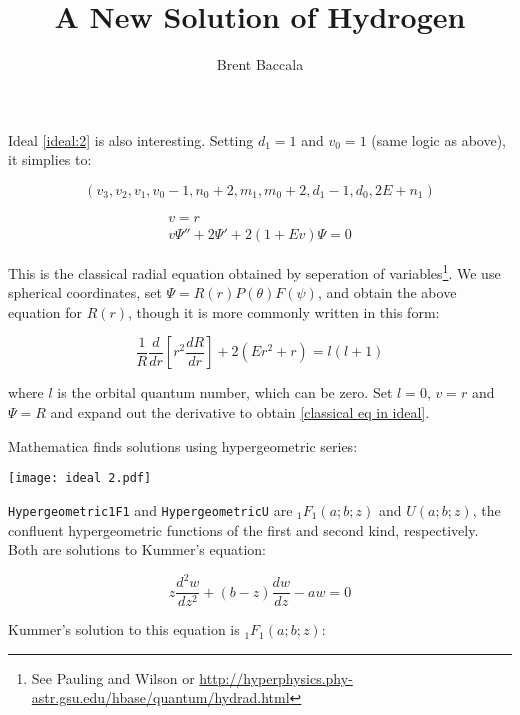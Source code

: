 \documentclass{article}
\title{A New Solution of Hydrogen}
\author{Brent Baccala}
\begin{document}
\parindent 0pt

Ideal \eqref{ideal:2} is also interesting.  Setting $d_1=1$ and $v_0=1$ (same logic as above), it simplies to:

\begin{equation}
\left(v_{3}, v_{2}, v_{1}, v_{0} - 1, n_{0} + 2, m_{1}, m_{0} + 2, d_{1} - 1, d_{0}, 2 E + n_{1}\right)
\end{equation}

\begin{equation}
\label{classical eq in ideal}
\begin{gathered}
v=r \\
v \Psi'' + 2 \Psi' + 2(1 + E v) \Psi = 0
\end{gathered}
\end{equation}

This is the classical radial equation obtained by seperation of variables\footnote{See
Pauling and Wilson or
\url{http://hyperphysics.phy-astr.gsu.edu/hbase/quantum/hydrad.html}}.  We use
spherical coordinates, set $\Psi = R(r)P(\theta)F(\psi)$, and obtain the above equation for $R(r)$,
though it is more commonly written in this form:

\begin{equation}
\frac{1}{R} \frac{d}{dr}\left[ r^2 \frac{dR}{dr}\right] + 2(Er^2 + r) = l(l+1)
\end{equation}

where $l$ is the orbital quantum number, which can be zero.  Set $l=0$, $v=r$ and $\Psi=R$ and
expand out the derivative to obtain \eqref{classical eq in ideal}.


Mathematica finds solutions using hypergeometric series:

\texttt{[image: ideal 2.pdf]}

{\tt Hypergeometric1F1} and {\tt HypergeometricU} are ${}_1F_1(a;b;z)$ and $U(a;b;z)$,
the confluent hypergeometric functions of the first and second kind,
respectively.  Both are solutions to Kummer's equation:

\begin{equation}
z\frac{d^2w}{dz^2} + (b-z)\frac{dw}{dz} - aw = 0
\end{equation}

Kummer's solution to this equation is ${}_1F_1(a;b;z)$:
\end{document}

